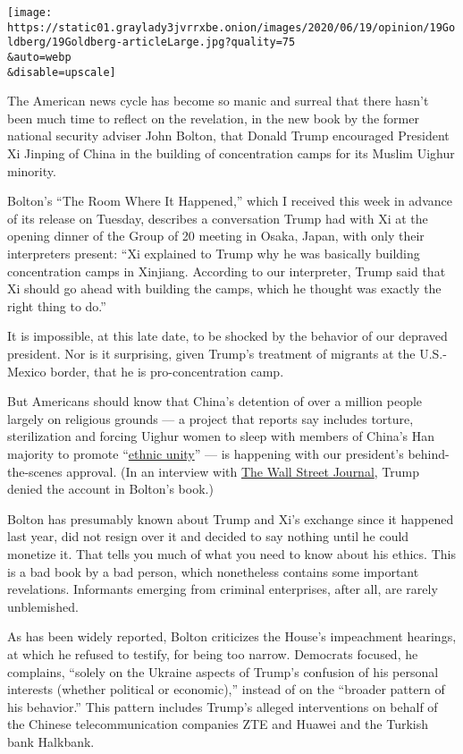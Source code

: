 \texttt{[image: https://static01.graylady3jvrrxbe.onion/images/2020/06/19/opinion/19Goldberg/19Goldberg-articleLarge.jpg?quality=75\\\&auto=webp\\\&disable=upscale]}

The American news cycle has become so manic and surreal that there
hasn't been much time to reflect on the revelation, in the new book by
the former national security adviser John Bolton, that Donald Trump
encouraged President Xi Jinping of China in the building of
concentration camps for its Muslim Uighur minority.

Bolton's ``The Room Where It Happened,'' which I received this week in
advance of its release on Tuesday, describes a conversation Trump had
with Xi at the opening dinner of the Group of 20 meeting in Osaka,
Japan, with only their interpreters present: ``Xi explained to Trump why
he was basically building concentration camps in Xinjiang. According to
our interpreter, Trump said that Xi should go ahead with building the
camps, which he thought was exactly the right thing to do.''

It is impossible, at this late date, to be shocked by the behavior of
our depraved president. Nor is it surprising, given Trump's treatment of
migrants at the U.S.-Mexico border, that he is pro-concentration camp.

But Americans should know that China's detention of over a million
people largely on religious grounds --- a project that reports say
includes torture, sterilization and forcing Uighur women to sleep with
members of China's Han majority to promote
``\href{https://www.nzherald.co.nz/world/news/article.cfm?c_id=2\&objectid=12295956}{ethnic
unity}'' --- is happening with our president's behind-the-scenes
approval. (In an interview with
\href{https://www.wsj.com/articles/transcript-of-president-trumps-interview-with-the-wall-street-journal-11592501000}{The
Wall Street Journal}, Trump denied the account in Bolton's book.)

Bolton has presumably known about Trump and Xi's exchange since it
happened last year, did not resign over it and decided to say nothing
until he could monetize it. That tells you much of what you need to know
about his ethics. This is a bad book by a bad person, which nonetheless
contains some important revelations. Informants emerging from criminal
enterprises, after all, are rarely unblemished.

As has been widely reported, Bolton criticizes the House's impeachment
hearings, at which he refused to testify, for being too narrow.
Democrats focused, he complains, ``solely on the Ukraine aspects of
Trump's confusion of his personal interests (whether political or
economic),'' instead of on the ``broader pattern of his behavior.'' This
pattern includes Trump's alleged interventions on behalf of the Chinese
telecommunication companies ZTE and Huawei and the Turkish bank
Halkbank.

